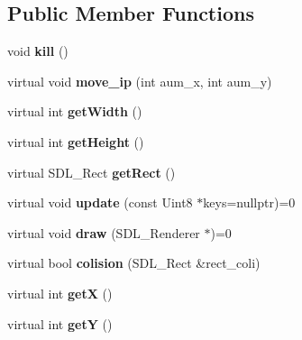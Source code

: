 \subsection*{Public Member Functions}
\begin{DoxyCompactItemize}
\item 
void {\bfseries kill} ()\hypertarget{class_sprite_a04ff4eaaddc06f78fb3ee62a378b56f1}{}\label{class_sprite_a04ff4eaaddc06f78fb3ee62a378b56f1}

\item 
virtual void {\bfseries move\+\_\+ip} (int aum\+\_\+x, int aum\+\_\+y)\hypertarget{class_sprite_affa2f0a7a5ff70a8a76b1fcb508b3734}{}\label{class_sprite_affa2f0a7a5ff70a8a76b1fcb508b3734}

\item 
virtual int {\bfseries get\+Width} ()\hypertarget{class_sprite_ad5ff0e44d2b0e6078d89052fe1239412}{}\label{class_sprite_ad5ff0e44d2b0e6078d89052fe1239412}

\item 
virtual int {\bfseries get\+Height} ()\hypertarget{class_sprite_a2cb36aa757cb89ab3a9eaa58aac7b811}{}\label{class_sprite_a2cb36aa757cb89ab3a9eaa58aac7b811}

\item 
virtual S\+D\+L\+\_\+\+Rect {\bfseries get\+Rect} ()\hypertarget{class_sprite_a982021460bab2601c9b8fb17fb5e813c}{}\label{class_sprite_a982021460bab2601c9b8fb17fb5e813c}

\item 
virtual void {\bfseries update} (const Uint8 $\ast$keys=nullptr)=0\hypertarget{class_sprite_a0a8ca1624419d06d732ea904a2bad80d}{}\label{class_sprite_a0a8ca1624419d06d732ea904a2bad80d}

\item 
virtual void {\bfseries draw} (S\+D\+L\+\_\+\+Renderer $\ast$)=0\hypertarget{class_sprite_ac480de275d989f6940410ed2a2eb2b3a}{}\label{class_sprite_ac480de275d989f6940410ed2a2eb2b3a}

\item 
virtual bool {\bfseries colision} (S\+D\+L\+\_\+\+Rect \&rect\+\_\+coli)\hypertarget{class_sprite_a7bac50446fdd124602253b8fa2054f13}{}\label{class_sprite_a7bac50446fdd124602253b8fa2054f13}

\item 
virtual int {\bfseries getX} ()\hypertarget{class_sprite_a752b7bed3151c8a3e018dfc4f974889d}{}\label{class_sprite_a752b7bed3151c8a3e018dfc4f974889d}

\item 
virtual int {\bfseries getY} ()\hypertarget{class_sprite_a2e5e826bf61baab6545be6fcdae8fd47}{}\label{class_sprite_a2e5e826bf61baab6545be6fcdae8fd47}


\end{DoxyCompactItemize}
